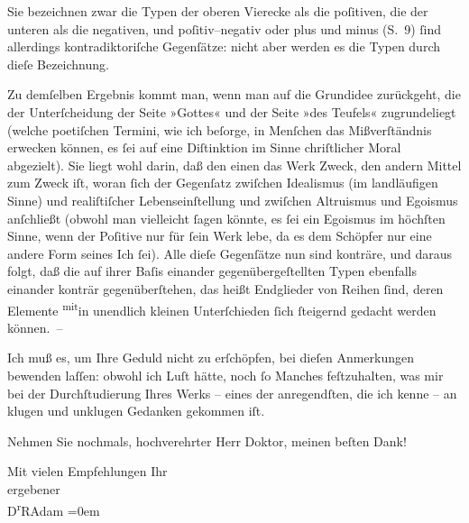 \pstart
           Sie bezeichnen zwar die Typen der oberen Vierecke als die poſitiven, die der unteren
               als die negativen, und poſitiv–negativ oder plus und
               minus (S. 9) ſind allerdings
               kontradiktoriſche Gegenſätze: nicht aber werden es die Typen durch dieſe
               Bezeichnung.\pend
           
\pstart
           Zu demſelben Ergebnis kommt {\pb}man, wenn man
               auf die Grundidee zurückgeht, die der Unterſcheidung der Seite »Gottes« und der Seite
               »des Teufels« zugrundeliegt (welche poetiſchen Termini, wie ich beſorge, in Menſchen
               das Mißverſtändnis erwecken können, es ſei auf eine Diſtinktion im Sinne chriſtlicher
               Moral abgezielt). Sie liegt wohl darin, daß den einen das Werk Zweck, den andern
               Mittel zum Zweck iſt, woran ſich der Gegenſatz zwiſchen Idealismus (im landläufigen
               Sinne) und realiſtiſcher Lebenseinſtellung und zwiſchen Altruismus und Egoismus
               anſchließt (obwohl man vielleicht ſagen könnte, es ſei ein Egoismus im höchſten
               Sinne, wenn der Poſitive nur für ſein Werk lebe, da es dem Schöpfer nur eine andere
               Form seines Ich ſei). {\pb}Alle dieſe
               Gegenſätze nun sind konträre, und daraus folgt, daß die auf ihrer Baſis einander
               gegenübergeſtellten Typen ebenfalls einander konträr gegenüberſtehen, das heißt
               Endglieder von Reihen ſind, deren Elemente \substVorne{}\textsuperscript{mit}\substDazwischen{}in\substHinten{} unendlich kleinen Unterſchieden ſich ſteigernd gedacht werden können. –\pend
           
\pstart
           Ich muß es, um Ihre Geduld nicht zu erſchöpfen, \strikeout{\textcolor{gray}{an}} bei dieſen Anmerkungen bewenden laſſen: obwohl ich Luſt hätte, noch ſo Manches
               feſtzuhalten, was mir bei der Durchſtudierung Ihres Werks – eines der anregendſten,
               die ich kenne – an klugen und unklugen Gedanken gekommen iſt.\pend
           
\pstart
           Nehmen Sie nochmals, hochverehrter Herr Doktor, meinen beſten {\pb}Dank!\pend
           
\pstart
           Mit vielen Empfehlungen Ihr{\\[\baselineskip]}ergebener{\\[\baselineskip]}\spacefill\mbox{D\textsuperscript{r}RAdam}\pend
           \leftskip=0em{}\endnumbering{}  
      